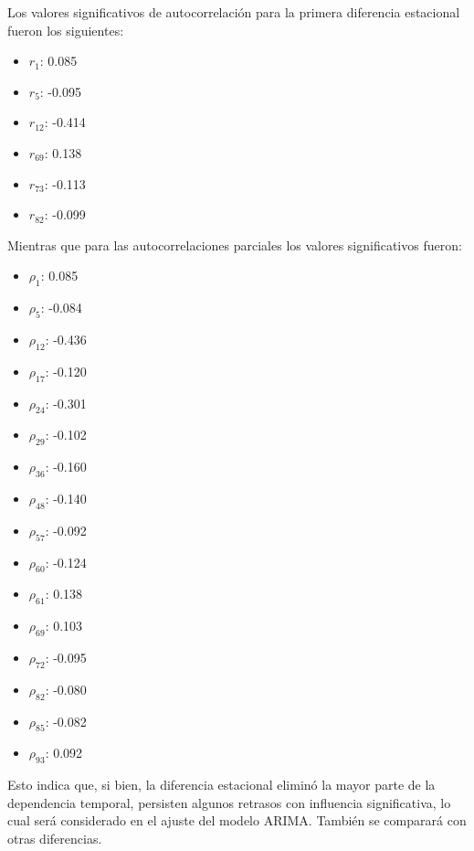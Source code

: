\documentclass[12pt,letterpaper]{article}   %
\begin{document}
Los valores significativos de autocorrelación para la primera diferencia estacional fueron los siguientes: \begin{multicols}{5} \scriptsize \begin{itemize} \item $r_1$: 0.085 \item $r_5$: -0.095 \item $r_{12}$: -0.414 \item $r_{69}$: 0.138 \item $r_{73}$: -0.113 \item $r_{82}$: -0.099 \end{itemize} \end{multicols}{}

\vspace{1em}

\normalsize Mientras que para las autocorrelaciones parciales los valores significativos fueron: \begin{multicols}{5} \scriptsize \begin{itemize} \item $\rho_1$: 0.085 \item $\rho_5$: -0.084 \item $\rho_{12}$: -0.436 \item $\rho_{17}$: -0.120 \item $\rho_{24}$: -0.301 \item $\rho_{29}$: -0.102 \item $\rho_{36}$: -0.160 \item $\rho_{48}$: -0.140 \item $\rho_{57}$: -0.092 \item $\rho_{60}$: -0.124 \item $\rho_{61}$: 0.138 \item $\rho_{69}$: 0.103 \item $\rho_{72}$: -0.095 \item $\rho_{82}$: -0.080 \item $\rho_{85}$: -0.082 \item $\rho_{93}$: 0.092 \end{itemize} \end{multicols}{}



Esto indica que, si bien, la diferencia estacional eliminó la mayor parte de la dependencia temporal, persisten algunos retrasos con influencia significativa, lo cual será considerado en el ajuste del modelo ARIMA. También se comparará con otras diferencias.
\end{document}
